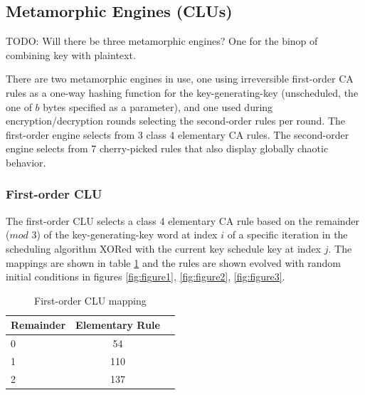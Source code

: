 \documentclass{article}
\begin{document}
\subsection{Metamorphic Engines (CLUs)}

TODO: Will there be three metamorphic engines? One for the binop of combining key with plaintext.

There are two metamorphic engines in use, one using irreversible first-order CA rules as a one-way hashing function for the key-generating-key (unscheduled, the one of $b$ bytes specified as a parameter), and one used during encryption/decryption rounds selecting the second-order rules per round. The first-order engine selects from 3 class 4 elementary CA rules. The second-order engine selects from 7 cherry-picked rules that also display globally chaotic behavior\cite{MECA-Properties}.

\subsubsection{First-order CLU}

The first-order CLU selects a class 4 elementary CA rule based on the remainder ($mod$ 3) of the key-generating-key word at index $i$ of a specific iteration in the scheduling algorithm XORed with the current key schedule key at index $j$. The mappings are shown in table \ref{tab:table1} and the rules are shown evolved with random initial conditions in figures \ref{fig:figure1}, \ref{fig:figure2}, \ref{fig:figure3}.

\begin{table}[h!]
  \begin{center}
    \caption{First-order CLU mapping}
    \label{tab:table1}
    \begin{tabular}{l|c|r} %
      \textbf{Remainder} & \textbf{Elementary Rule}\\
      \hline
      0 & 54\\
      1 & 110\\
      2 & 137\\
    \end{tabular}
  \end{center}
\end{table}
\end{document}
